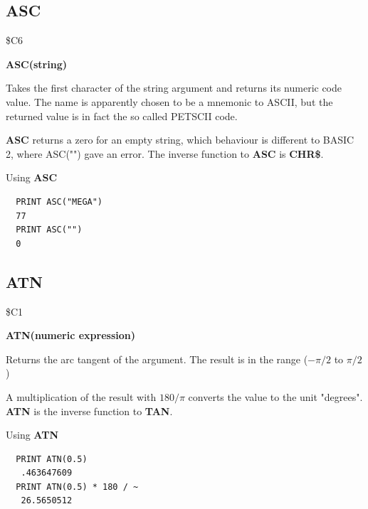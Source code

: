\subsection{ASC}
\begin{description}[leftmargin=2cm,style=nextline]
\item [Token:] \$C6
\item [Format:] {\bf ASC(string)}
\item [Usage:] Takes the first character of
               the string argument and returns its numeric code value.
               The name is apparently chosen to be a mnemonic to ASCII,
               but the returned value is in fact the so called PETSCII code.
\item [Remarks:]
               {\bf ASC} returns a zero for an empty string, which behaviour
               is different to BASIC 2, where ASC("") gave an error.
               The inverse function to {\bf ASC} is {\bf CHR\$}.
\item [Example:] Using {\bf ASC}
\begin{tcolorbox}[colback=black,coltext=white]
\verbatimfont{\codefont}
\begin{verbatim}
  PRINT ASC("MEGA")
  77
  PRINT ASC("")
  0
\end{verbatim}
\end{tcolorbox}
\end{description}


\newpage
\subsection{ATN}
\begin{description}[leftmargin=2cm,style=nextline]
\item [Token:] \$C1
\item [Format:] {\bf ATN(numeric expression)}
\item [Usage:] Returns the arc tangent of the argument.
               The result is in the range ($-\pi/2$ to $\pi/2$)

\item [Remarks:]
               A multiplication of the result with $180/\pi$
               converts the value to the unit "degrees".
               {\bf ATN} is the inverse function to {\bf TAN}.
\item [Example:] Using {\bf ATN}
\begin{tcolorbox}[colback=black,coltext=white]
\verbatimfont{\codefont}
\begin{verbatim}
  PRINT ATN(0.5)
   .463647609
  PRINT ATN(0.5) * 180 / ~
   26.5650512
\end{verbatim}
\end{tcolorbox}
\end{description}

